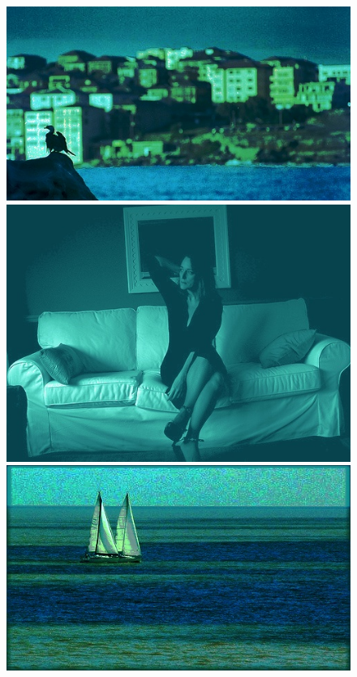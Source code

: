 \begin{appendices}
\begin{figure}[htb]
\begin{minipage}{0.19\textwidth}
\includegraphics[width=\textwidth]{images/anomalien/HS/008085.jpg}
\end{minipage}
\begin{minipage}{0.19\textwidth}
\includegraphics[width=\textwidth]{images/anomalien/HS/008103.jpg}
\end{minipage}
\begin{minipage}{0.19\textwidth}
\includegraphics[width=\textwidth]{images/anomalien/HS/008112.jpg}

\end{minipage}
\end{figure}
\end{appendices}
